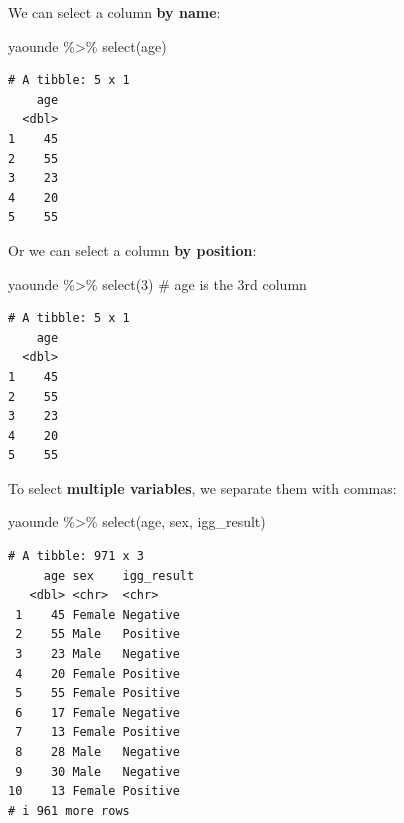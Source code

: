 \documentclass[
  letterpaper,
  DIV=11,
  numbers=noendperiod]{scrreprt}
\newenvironment{Shaded}{\begin{snugshade}}{\end{snugshade}}
\newcommand{\CommentTok}[1]{\textcolor[rgb]{0.37,0.37,0.37}{#1}}
\newcommand{\DecValTok}[1]{\textcolor[rgb]{0.68,0.00,0.00}{#1}}
\newcommand{\FunctionTok}[1]{\textcolor[rgb]{0.28,0.35,0.67}{#1}}
\newcommand{\NormalTok}[1]{\textcolor[rgb]{0.00,0.23,0.31}{#1}}
\newcommand{\SpecialCharTok}[1]{\textcolor[rgb]{0.37,0.37,0.37}{#1}}
\begin{document}
We can select a column \textbf{by name}:

\begin{Shaded}
\begin{Highlighting}[]
\NormalTok{yaounde }\SpecialCharTok{\%\textgreater{}\%} \FunctionTok{select}\NormalTok{(age) }
\end{Highlighting}
\end{Shaded}

\begin{verbatim}
# A tibble: 5 x 1
    age
  <dbl>
1    45
2    55
3    23
4    20
5    55
\end{verbatim}

Or we can select a column \textbf{by position}:

\begin{Shaded}
\begin{Highlighting}[]
\NormalTok{yaounde }\SpecialCharTok{\%\textgreater{}\%} \FunctionTok{select}\NormalTok{(}\DecValTok{3}\NormalTok{) }\CommentTok{\# \textasciigrave{}age\textasciigrave{} is the 3rd column}
\end{Highlighting}
\end{Shaded}

\begin{verbatim}
# A tibble: 5 x 1
    age
  <dbl>
1    45
2    55
3    23
4    20
5    55
\end{verbatim}

To select \textbf{multiple variables}, we separate them with commas:

\begin{Shaded}
\begin{Highlighting}[]
\NormalTok{yaounde }\SpecialCharTok{\%\textgreater{}\%} \FunctionTok{select}\NormalTok{(age, sex, igg\_result)}
\end{Highlighting}
\end{Shaded}

\begin{verbatim}
# A tibble: 971 x 3
     age sex    igg_result
   <dbl> <chr>  <chr>     
 1    45 Female Negative  
 2    55 Male   Positive  
 3    23 Male   Negative  
 4    20 Female Positive  
 5    55 Female Positive  
 6    17 Female Negative  
 7    13 Female Positive  
 8    28 Male   Negative  
 9    30 Male   Negative  
10    13 Female Positive  
# i 961 more rows
\end{verbatim}
\end{document}
